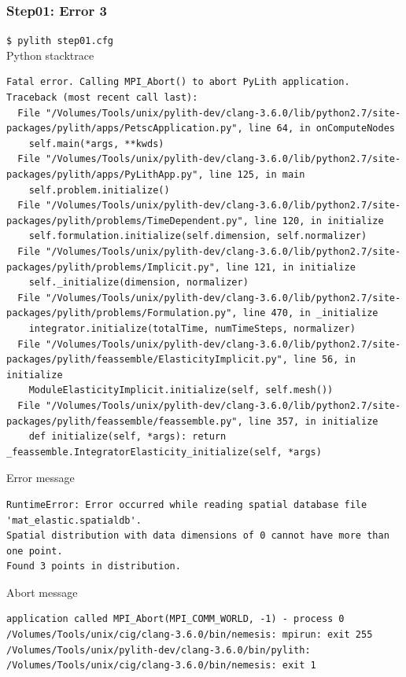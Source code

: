 \documentclass[aspectration=169]{beamer}
\newcommand{\cmd}[1]{{\footnotesize\tt \color{ltred}#1}}
\newcommand{\errlabel}[1]{{\small \color{blue}#1}}
\begin{document}
\begin{frame}[fragile]
  \frametitle{Step01: Error 3}

\cmd{\$ pylith step01.cfg}\\
\errlabel{Python stacktrace}
\begin{lstlisting}
Fatal error. Calling MPI_Abort() to abort PyLith application.
Traceback (most recent call last):
  File "/Volumes/Tools/unix/pylith-dev/clang-3.6.0/lib/python2.7/site-packages/pylith/apps/PetscApplication.py", line 64, in onComputeNodes
    self.main(*args, **kwds)
  File "/Volumes/Tools/unix/pylith-dev/clang-3.6.0/lib/python2.7/site-packages/pylith/apps/PyLithApp.py", line 125, in main
    self.problem.initialize()
  File "/Volumes/Tools/unix/pylith-dev/clang-3.6.0/lib/python2.7/site-packages/pylith/problems/TimeDependent.py", line 120, in initialize
    self.formulation.initialize(self.dimension, self.normalizer)
  File "/Volumes/Tools/unix/pylith-dev/clang-3.6.0/lib/python2.7/site-packages/pylith/problems/Implicit.py", line 121, in initialize
    self._initialize(dimension, normalizer)
  File "/Volumes/Tools/unix/pylith-dev/clang-3.6.0/lib/python2.7/site-packages/pylith/problems/Formulation.py", line 470, in _initialize
    integrator.initialize(totalTime, numTimeSteps, normalizer)
  File "/Volumes/Tools/unix/pylith-dev/clang-3.6.0/lib/python2.7/site-packages/pylith/feassemble/ElasticityImplicit.py", line 56, in initialize
    ModuleElasticityImplicit.initialize(self, self.mesh())
  File "/Volumes/Tools/unix/pylith-dev/clang-3.6.0/lib/python2.7/site-packages/pylith/feassemble/feassemble.py", line 357, in initialize
    def initialize(self, *args): return _feassemble.IntegratorElasticity_initialize(self, *args)
\end{lstlisting}
\errlabel{Error message}
\begin{lstlisting}
RuntimeError: Error occurred while reading spatial database file 'mat_elastic.spatialdb'.
Spatial distribution with data dimensions of 0 cannot have more than one point.
Found 3 points in distribution.
\end{lstlisting}
\errlabel{Abort message}
\begin{lstlisting}
application called MPI_Abort(MPI_COMM_WORLD, -1) - process 0
/Volumes/Tools/unix/cig/clang-3.6.0/bin/nemesis: mpirun: exit 255
/Volumes/Tools/unix/pylith-dev/clang-3.6.0/bin/pylith: /Volumes/Tools/unix/cig/clang-3.6.0/bin/nemesis: exit 1
\end{lstlisting}
  
\end{frame}
\end{document}
